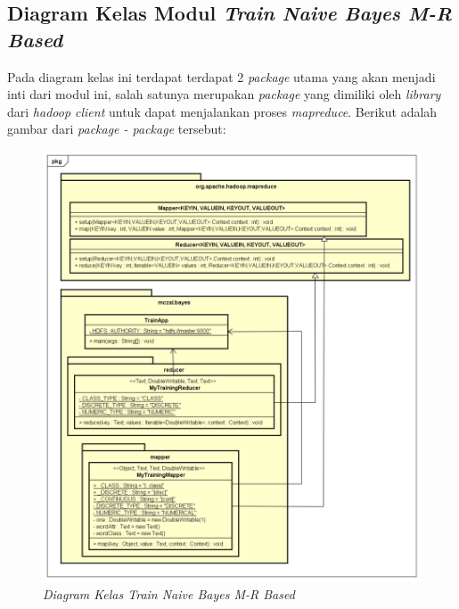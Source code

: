 \subsection{Diagram Kelas Modul \textit{Train Naive Bayes M-R Based}}
Pada diagram kelas ini terdapat terdapat 2 \textit{package} utama yang akan menjadi inti dari modul ini, salah satunya merupakan \textit{package} yang dimiliki oleh \textit{library} dari \textit{hadoop client} untuk dapat menjalankan proses \textit{mapreduce}. Berikut adalah gambar dari \textit{package - package} tersebut:
\begin{figure}[H]
	\centering
	\includegraphics[scale=0.6]{ClassDiagramLengkap/CD_Train_MR}
	\caption[Diagram Kelas \textit{Train Naive Bayes M-R Based}]{\textit{Diagram Kelas Train Naive Bayes M-R Based}}
	\label{fig:Diagram Kelas Modul Kelola Input}
\end{figure}

